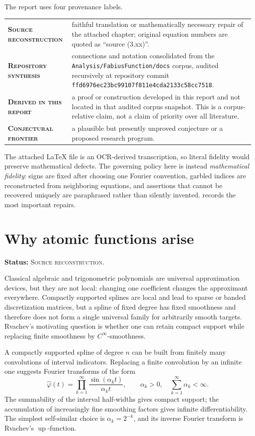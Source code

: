 \documentclass[11pt]{article}
\theoremstyle{definition}
\theoremstyle{remark}
\newcommand{\Up}{\operatorname{up}}
\newcommand{\SourceStatus}{\textcolor{SourceBlue}{\textsc{Source reconstruction}}}
\newcommand{\RepoStatus}{\textcolor{RepoOlive}{\textsc{Repository synthesis}}}
\newcommand{\DerivedStatus}{\textcolor{DerivedPurple}{\textsc{Derived in this report}}}
\newcommand{\FrontierStatus}{\textcolor{FrontierRed}{\textsc{Conjectural frontier}}}
\newcommand{\status}[1]{\par\smallskip\noindent\textbf{Status:} #1.\par\smallskip}
\begin{document}
The report uses four provenance labels.
\begin{center}
\begin{tabularx}{0.94\textwidth}{>{\bfseries}l X}
\toprule
\SourceStatus & faithful translation or mathematically necessary repair of the attached chapter; original equation numbers are quoted as ``source (3.xx)''.\\
\RepoStatus & connections and notation consolidated from the \texttt{Analysis/FabiusFunction/docs} corpus, audited recursively at repository commit \texttt{ffd6976ec23bc99107f811e4cda2133c58cc7518}.\\
\DerivedStatus & a proof or construction developed in this report and not located in that audited corpus snapshot.  This is a corpus-relative claim, not a claim of priority over all literature.\\
\FrontierStatus & a plausible but presently unproved conjecture or a proposed research program.\\
\bottomrule
\end{tabularx}
\end{center}

The attached \LaTeX{} file is an OCR-derived transcription, so literal fidelity would preserve mathematical defects.  The governing policy here is instead 
\emph{mathematical fidelity}: signs are fixed after choosing one Fourier convention, garbled indices are reconstructed from neighboring equations, and assertions that cannot be recovered uniquely are paraphrased rather than silently invented.   records the most important repairs.

\section{Why atomic functions arise}
\status{\SourceStatus}

Classical algebraic and trigonometric polynomials are universal approximation devices, but they are not local: changing one coefficient changes the approximant everywhere.  Compactly supported splines are local and lead to sparse or banded discretization matrices, but a spline of fixed degree has fixed smoothness and therefore does not form a single universal family for arbitrarily smooth targets.  Rvachev's motivating question is whether one can retain compact support while replacing finite smoothness by \(C^\infty\)-smoothness.

A compactly supported spline of degree \(n\) can be built from finitely many convolutions of interval indicators.  Replacing a finite convolution by an infinite one suggests Fourier transforms of the form
\begin{equation}
  \widehat\varphi(t)=\prod_{k=1}^{\infty}\frac{\sin(\alpha_k t)}{\alpha_k t},
  \qquad \alpha_k>0,\quad \sum_{k=1}^{\infty}\alpha_k<\infty.
  \label{eq:generic-sinc-product}
\end{equation}
The summability of the interval half-widths gives compact support; the accumulation of increasingly fine smoothing factors gives infinite differentiability.  The simplest self-similar choice is \(\alpha_k=2^{-k}\), and its inverse Fourier transform is Rvachev's \(\Up\)-function.
\end{document}
